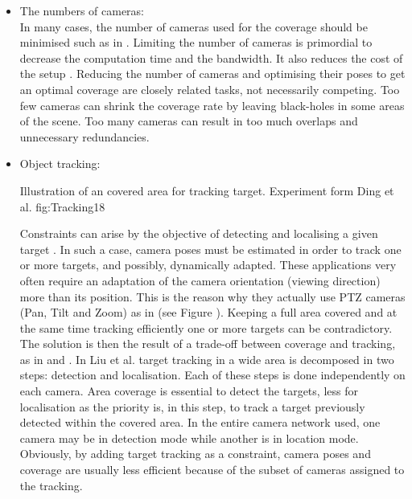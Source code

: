 \begin{itemize}
\item  The numbers of cameras: \\ In many cases,  the number of cameras used for the coverage should be minimised such as in  \cite{151*zhao2013,171*horster2006,22*zhao2008}. Limiting the number of cameras is primordial to decrease the computation time and the bandwidth. It also reduces the cost of the setup \cite{82*chrysostomou2012}. Reducing the number of cameras and optimising their poses to get an optimal coverage are closely related tasks, not necessarily competing. Too few cameras can shrink the coverage rate by leaving black-holes in some areas of the scene. Too many cameras can result in too much overlaps and unnecessary redundancies.\\

\item Object tracking: \\
\begin{mfigures}[!]{Illustration of an covered area for tracking target. Experiment  form Ding et al. \citep{18*ding2012} }{fig:Tracking18} \centering
{}
\hspace{1cm} \\
\end{mfigures}	
 Constraints can arise by the objective of detecting and localising a given target \cite{18*ding2012,12*soto2009,23*liu2009,39*wu2011,40*sohrabi2000,22*zhao2008}. In such a case, camera poses must be estimated in order to track one or more targets, and possibly, dynamically adapted. These applications very often require an adaptation of the camera orientation (viewing direction) more than its position. This is the reason why they actually use PTZ cameras (Pan, Tilt and Zoom) as in \cite{18*ding2012,38*liu2010,12*soto2009} (see Figure \citep{18*ding2012}).
Keeping a full area covered and at the same time tracking efficiently one or more targets can be contradictory. The solution is then the result of a trade-off between coverage and tracking, as in \cite{18*ding2012} and \cite{38*liu2010}.
 In Liu et al. \cite{38*liu2010} target tracking in a wide area is decomposed in two steps: detection and localisation. Each of these steps is done independently on each camera. Area coverage is essential to detect the targets, less for localisation as the priority is, in this step, to track a target previously detected within the covered area. In the entire camera network used, one camera may be in detection mode while another is in location mode. Obviously, by adding target tracking as a constraint, camera poses and coverage are usually less efficient because of the subset of cameras assigned to the tracking.  \\


\end{itemize}
